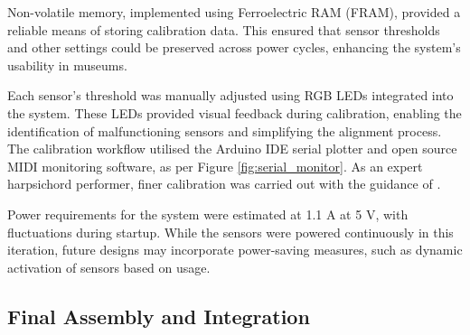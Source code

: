 Non-volatile memory, implemented using Ferroelectric RAM (FRAM), provided a reliable means of storing calibration data. This ensured that sensor thresholds and other settings could be preserved across power cycles, enhancing the system's usability in museums.


Each sensor's threshold was manually adjusted using RGB LEDs integrated into the system. These LEDs provided visual feedback during calibration, enabling the identification of malfunctioning sensors and simplifying the alignment process. The calibration workflow utilised the Arduino IDE serial plotter and open source MIDI monitoring software, as per Figure \ref{fig:serial_monitor}. As an expert harpsichord performer, finer calibration was carried out with the guidance of .


Power requirements for the system were estimated at 1.1 A at 5 V, with fluctuations during startup. While the sensors were powered continuously in this iteration, future designs may incorporate power-saving measures, such as dynamic activation of sensors based on usage.



\subsection{Final Assembly and Integration}

